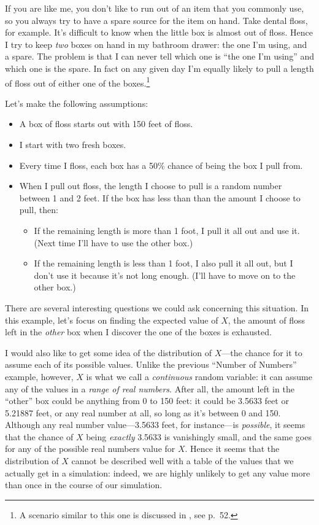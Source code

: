 \documentclass[]{book}
\providecommand{\tightlist}{%
  \setlength{\itemsep}{0pt}\setlength{\parskip}{0pt}}
\let\rmarkdownfootnote\footnote%
\def\footnote{\protect\rmarkdownfootnote}
\theoremstyle{definition}
\theoremstyle{definition}
\theoremstyle{definition}
\theoremstyle{remark}
\begin{document}
{If you are like me, you don't like to run out of an item that you
commonly use, so you always try to have a spare source for the item on
hand. Take dental floss, for example. It's difficult to know when the
little box is almost out of floss. Hence I try to keep \emph{two} boxes
on hand in my bathroom drawer: the one I'm using, and a spare. The
problem is that I can never tell which one is ``the one I'm using'' and
which one is the spare. In fact on any given day I'm equally likely to
pull a length of floss out of either one of the boxes.\footnote{A
  scenario similar to this one is discussed in \citep{Nahin2008}, see
  p.~52.}

Let's make the following assumptions:

\begin{itemize}
\tightlist
\item
  A box of floss starts out with 150 feet of floss.
\item
  I start with two fresh boxes.
\item
  Every time I floss, each box has a 50\% chance of being the box I pull
  from.
\item
  When I pull out floss, the length I choose to pull is a random number
  between 1 and 2 feet. If the box has less than than the amount I
  choose to pull, then:

  \begin{itemize}
  \tightlist
  \item
    If the remaining length is more than 1 foot, I pull it all out and
    use it. (Next time I'll have to use the other box.)
  \item
    If the remaining length is less than 1 foot, I also pull it all out,
    but I don't use it because it's not long enough. (I'll have to move
    on to the other box.)
  \end{itemize}
\end{itemize}

There are several interesting questions we could ask concerning this
situation. In this example, let's focus on finding the expected value of
\(X\), the amount of floss left in the \emph{other} box when I discover
the one of the boxes is exhausted.

I would also like to get some idea of the distribution of \(X\)---the
chance for it to assume each of its possible values. Unlike the previous
``Number of Numbers'' example, however, \(X\) is what we call a
\emph{continuous} random variable: it
can assume any of the values in a \emph{range of real numbers}. After
all, the amount left in the ``other'' box could be anything from 0 to
150 feet: it could be 3.5633 feet or 5.21887 feet, or any real number at
all, so long as it's between 0 and 150. Although any real number
value---3.5633 feet, for instance---is \emph{possible}, it seems that
the chance of \(X\) being \emph{exactly} 3.5633 is vanishingly small,
and the same goes for any of the possible real numbers value for \(X\).
Hence it seems that the distribution of \(X\) cannot be described well
with a table of the values that we actually get in a simulation: indeed,
we are highly unlikely to get any value more than once in the course of
our simulation.

}
\end{document}

